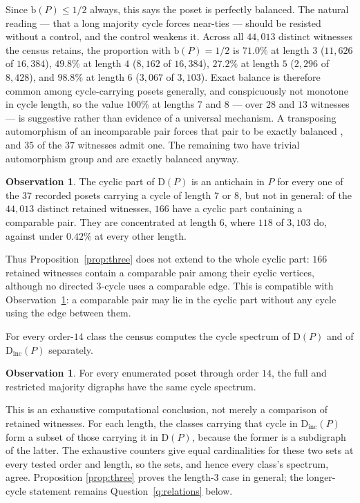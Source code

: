 \documentclass[11pt]{article}
\theoremstyle{definition}
\newtheorem{observation}[theorem]{Observation}
\newcommand{\bal}{\mathrm{b}}
\newcommand{\Dig}{\mathrm{D}}
\newcommand{\NWITNESS}{44{,}013}
\begin{document}
Since $\bal(P)\leq1/2$ always, this says the poset is perfectly balanced.  The
natural reading --- that a long majority cycle forces near-ties --- should be
resisted without a control, and the control weakens it.  Across all
$\NWITNESS$ distinct witnesses the census retains, the proportion with
$\bal(P)=1/2$ is $71.0\%$ at length $3$ ($11{,}626$ of $16{,}384$), $49.8\%$
at length $4$ ($8{,}162$ of $16{,}384$), $27.2\%$ at length $5$ ($2{,}296$ of
$8{,}428$), and $98.8\%$ at length $6$ ($3{,}067$ of $3{,}103$).  Exact
balance is therefore common among
cycle-carrying posets generally, and conspicuously not monotone in cycle
length, so the value $100\%$ at lengths $7$ and $8$ --- over $28$ and $13$
witnesses --- is suggestive rather than evidence of a universal mechanism.
A transposing automorphism of an incomparable pair forces that pair to be
exactly balanced \cite[Prop.~2.3]{olson-sagan}, and $35$ of the $37$ witnesses
admit one.  The remaining two have trivial automorphism group and are exactly
balanced anyway.

\begin{observation}\label{obs:antichain}
The cyclic part of $\Dig(P)$ is an antichain in $P$ for every one of the $37$
recorded posets carrying a cycle of length $7$ or $8$, but not in general:
of the $\NWITNESS$ distinct retained witnesses, $166$ have a cyclic part
containing a comparable pair.  They are concentrated at length $6$, where
$118$ of $3{,}103$ do, against under $0.42\%$ at every other length.
\end{observation}

Thus Proposition~\ref{prop:three} does not extend to the whole cyclic part:
$166$ retained witnesses contain a comparable pair among their cyclic
vertices, although no directed $3$-cycle uses a comparable edge.  This is
compatible with Observation~\ref{obs:relations}: a comparable pair may lie in
the cyclic part without any cycle using the edge between them.

For every order-$14$ class the census computes the cycle spectrum of $\Dig(P)$
and of $\Dig_{\mathrm{inc}}(P)$ separately.

\begin{observation}\label{obs:relations}
For every enumerated poset through order $14$, the full and restricted
majority digraphs have the same cycle spectrum.
\end{observation}

This is an exhaustive computational conclusion, not merely a comparison of
retained witnesses.  For each length, the classes carrying that cycle in
$\Dig_{\mathrm{inc}}(P)$ form a subset of those carrying it in $\Dig(P)$,
because the former is a subdigraph of the latter.  The exhaustive counters
give equal cardinalities for these two sets at every tested order and length,
so the sets, and hence every class's spectrum, agree.  Proposition
\ref{prop:three} proves the length-$3$ case in general; the longer-cycle
statement remains Question~\ref{q:relations} below.
\end{document}
